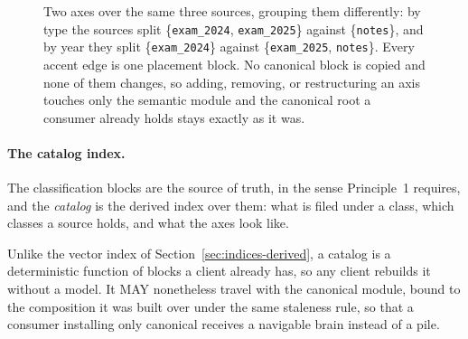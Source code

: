 \documentclass[11pt,a4paper]{article}
\begin{document}
\begin{figure}[t]
\centering
{}
\caption{Two axes over the same three sources, grouping them differently:
by type the sources split \{\texttt{exam\_2024}, \texttt{exam\_2025}\} against
\{\texttt{notes}\}, and by year they split \{\texttt{exam\_2024}\} against
\{\texttt{exam\_2025}, \texttt{notes}\}. Every accent edge is one
placement block. No canonical block is copied and none of them changes, so
adding, removing, or restructuring an axis touches only the semantic module and
the canonical root a consumer already holds stays exactly as it was.}
\label{fig:catalog}
\end{figure}

\paragraph{The catalog index.}
The classification blocks are the source of truth, in the sense Principle~1
requires, and the \emph{catalog} is the derived index over them: what is filed
under a class, which classes a source holds, and what the axes look like.

Unlike the vector index of Section~\ref{sec:indices-derived}, a catalog is a
deterministic function of blocks a client already has, so any client rebuilds
it without a model. It MAY nonetheless travel with the canonical module, bound
to the composition it was built over under the same staleness rule, so that a
consumer installing only canonical receives a navigable brain instead of a
pile.
\end{document}
